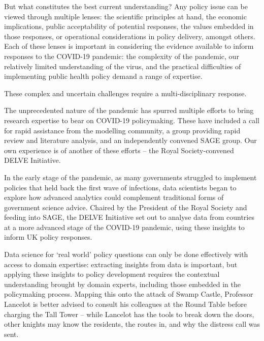\documentclass[a4paper]{caesar_book}
\begin{document}
But what constitutes the best current understanding? Any policy issue can be viewed through multiple lenses: the scientific principles at hand, the economic implications, public acceptability of potential responses, the values embedded in those responses, or operational considerations in policy delivery, amongst others. Each of these lenses is important in considering the evidence available to inform responses to the COVID-19 pandemic: the complexity of the pandemic, our relatively limited understanding of the virus, and the practical difficulties of implementing public health policy demand a range of expertise.

These complex and uncertain challenges require a multi-disciplinary response.

The unprecedented nature of the pandemic has spurred multiple efforts to bring research expertise to bear on COVID-19 policymaking. These have included a call for rapid assistance from the modelling community, a group providing rapid review and literature analysis, and an independently convened SAGE group. Our own experience is of another of these efforts – the Royal Society-convened DELVE Initiative.

In the early stage of the pandemic, as many governments struggled to implement policies that held back the first wave of infections, data scientists began to explore how advanced analytics could complement traditional forms of government science advice. Chaired by the President of the Royal Society and feeding into SAGE, the DELVE Initiative set out to analyse data from countries at a more advanced stage of the COVID-19 pandemic, using these insights to inform UK policy responses.

Data science for ‘real world’ policy questions can only be done effectively with access to domain expertise: extracting insights from data is important, but applying these insights to policy development requires the contextual understanding brought by domain experts, including those embedded in the policymaking process. Mapping this onto the attack of Swamp Castle, Professor Lancelot is better advised to consult his colleagues at the Round Table before charging the Tall Tower – while Lancelot has the tools to break down the doors, other knights may know the residents, the routes in, and why the distress call was sent.
\end{document}
